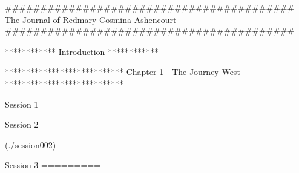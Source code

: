 #########################################
The Journal of Redmary Cosmina Ashencourt
#########################################

	************
	Introduction
	************
	
		

	****************************
	Chapter 1 - The Journey West
	****************************
		
		Session 1
		=========
		
			

		Session 2
		=========
	
			(./session002)
			
		Session 3
		=========
